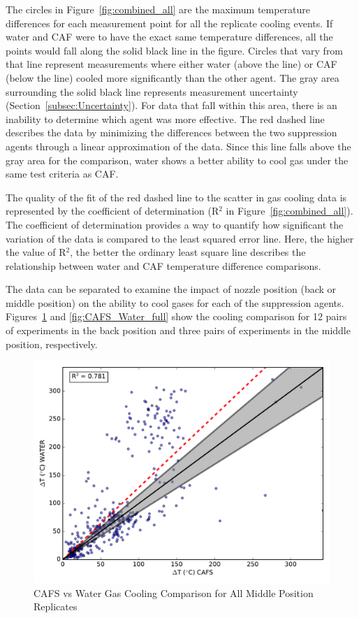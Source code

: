 \documentclass[12pt,oneside]{book}
\begin{document}
The circles in Figure~\ref{fig:combined_all} are the maximum temperature differences for each measurement point for all the replicate cooling events. If water and CAF were to have the exact same temperature differences, all the points would fall along the solid black line in the figure. Circles that vary from that line represent measurements where either water (above the line) or CAF (below the line) cooled more significantly than the other agent. The gray area surrounding the solid black line represents measurement uncertainty (Section~\ref{subsec:Uncertainty}). For data that fall within this area, there is an inability to determine which agent was more effective. The red dashed line describes the data by minimizing the differences between the two suppression agents through a linear approximation of the data. Since this line falls above the gray area for the comparison, water shows a better ability to cool gas under the same test criteria as CAF.

The quality of the fit of the red dashed line to the scatter in gas cooling data is represented by the coefficient of determination (R$^2$ in Figure~\ref{fig:combined_all}). The coefficient of determination provides a way to quantify how significant the variation of the data is compared to the least squared error line. Here, the higher the value of R$^2$, the better the ordinary least square line describes the relationship between water and CAF temperature difference comparisons. 

The data can be separated to examine the impact of nozzle position (back or middle position) on the ability to cool gases for each of the suppression agents. Figures~\ref{fig:CAFS_Water_mid} and \ref{fig:CAFS_Water_full} show the cooling comparison for 12 pairs of experiments in the back position and three pairs of experiments in the middle position, respectively.

\begin{figure}[!ht]
	\includegraphics[width=.7\columnwidth]{../Figures/Gas_Cooling/Combined_mid_scatter}
	\caption{CAFS vs Water Gas Cooling Comparison for All Middle Position Replicates}
	\label{fig:CAFS_Water_mid}
\end{figure}
\end{document}
